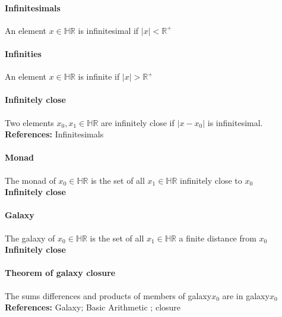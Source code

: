 \documentclass[12pt, a4paper,oneside]{book}
\begin{document}
\paragraph{Infinitesimals}
\begin{paragraph} An element  \(x \in \mathbb{HR}\) is infinitesimal if \(\vert x \vert < \mathbb{R^+}\)
\end{paragraph}
\paragraph{Infinities}
\begin{paragraph}
An element \( x \in \mathbb{HR}\) is infinite if \(\vert x \vert > \mathbb{R^+}\)
\end{paragraph}
\paragraph{Infinitely close}
\begin{paragraph}
Two elements \(x_0,x_1 \in \mathbb{HR}\) are infinitely close if \(\vert x-x_0 \vert\) is infinitesimal.\\
\textbf{References:} Infinitesimals 
\end{paragraph}
\paragraph{Monad}
\begin{paragraph}
The monad of \(x_0 \in \mathbb{HR}\) is the set of all \(x_1 \in \mathbb{HR}\) infinitely close to \(x_0\)\\
\textbf{Infinitely close}
\end{paragraph}
\paragraph{Galaxy}
\begin{paragraph}
The galaxy of \(x_0 \in \mathbb{HR}\) is the set of all \(x_1 \in \mathbb{HR}\) a finite distance from \(x_0\)\\
\textbf{Infinitely close}
\end{paragraph}
\paragraph{Theorem of galaxy closure}
\begin{paragraph}
The sums differences and products of members of galaxy\(x_0\) are in galaxy\(x_0\)\\
\textbf{References:} Galaxy; Basic Arithmetic ; closure
\end{paragraph}
\end{document}
